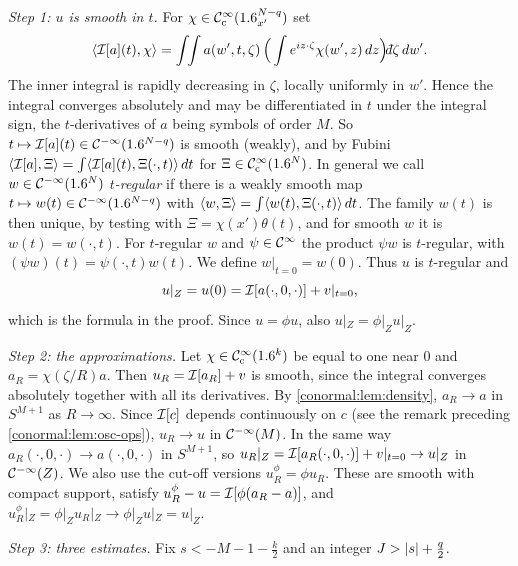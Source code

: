 \emph{Step 1: $u$ is smooth in $t$.} For $\chi\in\mathcal{C}^\infty_{\mathrm{c}}(1.6^{N-q}_{x'})$ set
\begin{equation*}
\pair{\osc{a}(t)}{\chi}=\int\!\!\int a(w',t,\zeta)\,\Big(\int e^{iz\cdot\zeta}\chi(w',z)\,dz\Big)\dbar\zeta\,dw'.
\end{equation*}
The inner integral is rapidly decreasing in $\zeta$, locally uniformly in $w'$. Hence the
integral converges absolutely and may be differentiated in $t$ under the integral sign,
the $t$-derivatives of $a$ being symbols of order $M$. So $t\mapsto\mathcal{I}[a](t)\in\mathcal{C}^{-\infty}(1.6^{N-q})$
is smooth (weakly), and by Fubini $\langle \mathcal{I}[a], \Xi\rangle=\int\langle \mathcal{I}[a](t), \Xi(\cdot,t)\rangle\,dt$
for $\Xi\in\mathcal{C}^\infty_{\mathrm{c}}(1.6^N)$. In general we call $w\in\mathcal{C}^{-\infty}(1.6^N)$ \emph{$t$-regular} if there is a
weakly smooth map $t\mapsto w(t)\in\mathcal{C}^{-\infty}(1.6^{N-q})$ with
$\langle w, \Xi\rangle=\int\langle w(t), \Xi(\cdot,t)\rangle\,dt$. The family $w(t)$ is then unique, by
testing with $\Xi=\chi(x')\theta(t)$, and for smooth $w$ it is $w(t)=w(\cdot,t)$. For
$t$-regular $w$ and $\psi\in\mathcal{C}^\infty$ the product $\psi w$ is $t$-regular, with
$(\psi w)(t)=\psi(\cdot,t)w(t)$. We define $w|_{t=0}=w(0)$. Thus $u$ is $t$-regular and
\begin{equation}\label{solmanifolds:eq:restriction}
u|_Z=u(0)=\mathcal{I}[a(\cdot,0,\cdot)]+v|_{t=0},
\end{equation}
which is the formula in the proof. Since $u=\phi u$, also $u|_Z=\phi|_Zu|_Z$.

\emph{Step 2: the approximations.} Let $\chi\in\mathcal{C}^\infty_{\mathrm{c}}(1.6^k)$ be equal to one near $0$ and
$a_R=\chi(\zeta/R)a$. Then $u_R=\mathcal{I}[a_R]+v$ is smooth, since the integral converges
absolutely together with all its derivatives. By \cref{conormal:lem:density}, $a_R\to a$ in
$S^{M+1}$ as $R\to\infty$. Since $\mathcal{I}[c]$ depends continuously on $c$ (see the
remark preceding \cref{conormal:lem:osc-ops}), $u_R\to u$ in $\mathcal{C}^{-\infty}(M)$. In the same way
$a_R(\cdot,0,\cdot)\to a(\cdot,0,\cdot)$ in $S^{M+1}$, so
$u_R|_Z=\mathcal{I}[a_R(\cdot,0,\cdot)]+v|_{t=0}\to u|_Z$ in $\mathcal{C}^{-\infty}(Z)$. We also use the cut-off
versions $u^\phi_R=\phi u_R$. These are smooth with compact support, satisfy
$u^\phi_R-u=\mathcal{I}[\phi(a_R-a)]$, and $u^\phi_R|_Z=\phi|_Zu_R|_Z\to\phi|_Zu|_Z=u|_Z$.

\emph{Step 3: three estimates.} Fix $s<-M-1-\frac k2$ and an integer $J>\lvert s\rvert+\frac q2$.

